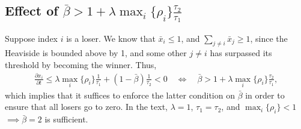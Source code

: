 \documentclass[a4paper]{article}
\begin{document}
\subsection{Effect of $\bar{\beta} > 1 + \lambda \max_i\{\rho_i\} \frac{\tau_2}{\tau_1}$}

Suppose index $i$ is a loser.
We know that $\bar{x}_i \le 1$, and $\sum_{j \ne i} \bar{x}_j \ge 1$, since the Heaviside is bounded above by 1, and some other $j \ne i$ has surpassed its threshold by becoming the winner.
Thus,
\begin{align}
 \frac{{\partial x}_i}{\partial t} \le \lambda \max_i\{\rho_i\} \frac{1}{\tau_1} + \left( 1 - \bar{\beta} \right) \frac{1}{\tau_2} < 0 \quad \iff \quad \bar{\beta} > 1 + \lambda \max_i\{\rho_i\} \frac{\tau_2}{\tau_1} ,
\end{align}
which implies that it suffices to enforce the latter condition on $\bar{\beta}$ in order to ensure that all losers go to zero. 
In the text, $\lambda = 1$, $\tau_1 = \tau_2$, and $\max_i\{\rho_i\} < 1$ $\implies \bar{\beta} = 2$ is sufficient.
\end{document}
